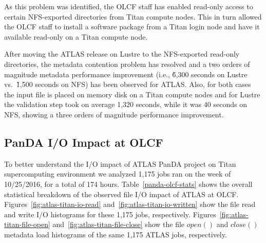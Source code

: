 As this problem was identified, the OLCF staff has enabled read-only access to
certain NFS-exported directories from Titan compute nodes. This in turn allowed
the OLCF staff to install a software package from a Titan login node and have
it available read-only on a Titan compute node.

After moving the ATLAS release on Lustre to the NFS-exported read-only
directories, the metadata contention problem has resolved and a two orders of
magnitude metadata performance improvement (i.e., \~6,300 seconds on Lustre vs.\
\~1,500 seconds on NFS) has been observed for ATLAS\@.  Also, for both cases the
input file is placed on memory disk on a Titan compute nodes and for Lustre the
validation step took on average 1,320 seconds, while it was 40 seconds on NFS,
showing a three orders of magnitude performance improvement.




\subsection{PanDA I/O Impact at OLCF}

To better understand the I/O impact of ATLAS PanDA project on Titan
supercomputing environment we analyzed 1,175 jobs ran on the week of 10/25/2016,
for a total of 174 hours. Table~\ref{panda-olcf-stats} shows the overall
statistical breakdown of the observed file I/O impact of ATLAS at OLCF\@.
Figures~\ref{fig:atlas-titan-io-read} and~\ref{fig:atlas-titan-io-written} show
the file read and write I/O histograms for these 1,175 jobs, respectively.
Figures~\ref{fig:atlas-titan-file-open} and~\ref{fig:atlas-titan-file-close}
show the file $open()$ and $close()$ metadata load histograms of the same 1,175
ATLAS jobs, respectively.

